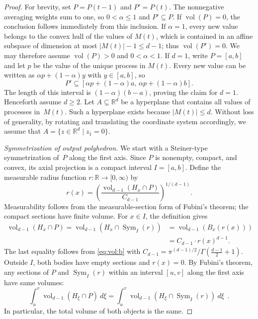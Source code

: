 \documentclass[preprint,12pt,a4paper]{elsarticle}
\theoremstyle{plain}
\theoremstyle{definition}
\DeclareMathOperator{\vol}{vol}
\DeclareMathOperator{\Sym}{Sym}
\newcommand{\IR}{\mathbb{R}}
\newcommand{\Ball}{B}
\renewcommand{\leq}{\leqslant}
\renewcommand{\geq}{\geqslant}
\begin{document}
\begin{proof}
	For brevity, set $P = P(t-1)$ and $P' = P(t)$.
	The nonnegative averaging weights sum to one, so $0<\alpha\leq 1$ and $P'\subseteq P$.
	If $\vol(P)=0$, the conclusion follows immediately from this inclusion.
	If $\alpha=1$, every new value belongs to the convex hull of the values of $M(t)$, which is contained in an affine subspace of dimension at most $\lvert M(t)\rvert-1\leq d-1$; thus $\vol(P')=0$.
	We may therefore assume $\vol(P)>0$ and $0<\alpha<1$.
	If $d=1$, write $P=[a,b]$ and let $p$ be the value of the unique process in $M(t)$.
	Every new value can be written as $\alpha p+(1-\alpha)y$ with $y\in[a,b]$, so
	\[
		P'\subseteq[\alpha p+(1-\alpha)a,\,\alpha p+(1-\alpha)b].
	\]
	The length of this interval is $(1-\alpha)(b-a)$, proving the claim for $d=1$.
	Henceforth assume $d\geq 2$.
	Let $A\subseteq \IR^d$ be a hyperplane that contains all values of processes in~$M(t)$.
	Such a hyperplane exists because $\lvert M(t)\rvert \leq d$.
	Without loss of generality, by rotating and translating the coordinate system accordingly,
	we assume that $A = \{z\in\IR^d \mid z_1 = 0\}$.

	\medskip

	\noindent\emph{Symmetrization of output polyhedron.}
	We start with a Steiner-type symmetrization of~$P$ along the first axis.
	Since $P$ is nonempty, compact, and convex, its axial projection is a compact interval $I=[a,b]$.
	Define the measurable radius function $r:\IR\to[0,\infty)$ by
	\[
		r(x)=\left(\frac{\vol_{d-1}(H_x\cap P)}{C_{d-1}}\right)^{1/(d-1)}.
	\]
	Measurability follows from the measurable-section form of Fubini's theorem; the compact sections have finite volume.
	For $x\in I$, the definition gives
	\begin{align}
		\vol_{d-1}(H_x \cap P) = \vol_{d-1}(H_x \cap \Sym_I(r)) & = \vol_{d-1}(\Ball_x(r(x))) \nonumber \\
		                                                     & = C_{d-1} \cdot r(x)^{d-1}.\label{eq:volume:ball}
	\end{align}
	The last equality follows from \eqref{eq:vol:b} with $C_{d-1} = \pi^{(d-1)/2}/\Gamma\left(\frac{d-1}{2}+1\right)$.
	Outside $I$, both bodies have empty sections and $r(x)=0$.
	By Fubini's theorem, any sections of $P$ and $\Sym_I(r)$ within an interval $[u,v]$ along the first axis
	have same volumes:
	\[
		\int_{u}^{v}\vol_{d-1}\left( H_\xi \cap P \right)\ d\xi =
		\int_{u}^{v}\vol_{d-1}\left( H_\xi \cap \Sym_I(r) \right)\ d\xi
		\enspace.
	\]
	In particular, the total volume of both objects is the same.


\end{proof}
\end{document}
